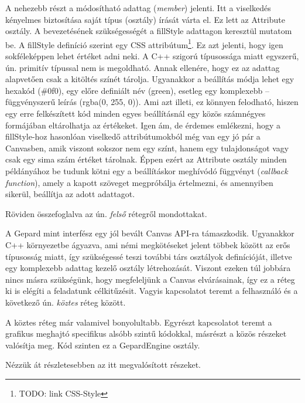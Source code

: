 \documentclass[12pt]{report}
\theoremstyle{definition}
\newcommand{\inenglish}[1]{\textsl{#1}}
\newcommand{\func}[1]{{\textsf{\footnotesize#1}}}
\begin{document}
  A nehezebb részt a módosítható adattag (\inenglish{member}) jelenti. Itt
a viselkedés kényelmes biztosítása saját típus (osztály) írását várta el. Ez
lett az \func{Attribute} osztály. A bevezetésének szükségességét a
\func{fillStyle} adattagon keresztül mutatom be. A \func{fillStyle} definíció szerint
egy CSS attribútum\footnote{TODO: link CSS-Style}. Ez azt jelenti, hogy igen
sokféleképpen lehet értéket adni neki. A C++ szigorú típusossága miatt
egyszerű, ún. primitív típussal nem is megoldható. Annak ellenére, hogy ez az
adattag alapvetően csak a kitöltés színét tárolja. Ugyanakkor a beállítás módja
lehet egy hexakód (\func{\#0f0}), egy előre definiált név
(\func{green}), esetleg egy komplexebb -- függvényszerű leírás
(\func{rgba(0, 255, 0)}). Ami azt illeti, ez könnyen felodható, hiszen egy
erre felkészített kód minden egyes beállításnál egy közös számnégyes formájában
eltárolhatja az értékeket. Igen ám, de érdemes emlékezni, hogy a
\func{fillStyle}-hoz
hasonlóan viselkedő attribútumokból még van egy jó pár a Canvasben, amik
viszont sokszor nem egy színt, hanem egy tulajdonságot vagy csak egy sima szám
értéket tárolnak. Éppen ezért az \func{Attribute} osztály minden példányához be tudunk
kötni egy a beállításkor meghívódó függvényt (\inenglish{callback function}),
amely a kapott szöveget megpróbálja értelmezni, és amennyiben sikerül,
beállítja az adott adattagot.

  Röviden összefoglalva az ún. \emph{felső} rétegről mondottakat.

  A \func{Gepard} mint interfész egy jól bevált Canvas API-ra támaszkodik.
Ugyanakkor C++ környezetbe ágyazva, ami némi megkötéseket jelent többek között
az erős típusosság miatt, így szükségessé teszi további társ osztályok
definícióját, illetve egy komplexebb adattag kezelő osztály létrehozását.
Viszont ezeken túl jobbára nincs másra szükségünk, hogy megfeleljünk a Canvas
elvárásainak, így ez a réteg ki is elégíti a feladatunk célkitűzésit. Vagyis
kapcsolatot teremt a felhasználó és a következő ún. \emph{köztes} réteg között.

  A köztes réteg már valamivel bonyolultabb. Egyrészt kapcsolatot teremt a
grafikus meghajtó specifikus alsóbb szintű kódokkal, másrészt a közös
részeket valósítja meg. Kód szinten ez a \func{GepardEngine} osztály.

  Nézzük át részletesebben az itt megvalósított részeket.
\end{document}
